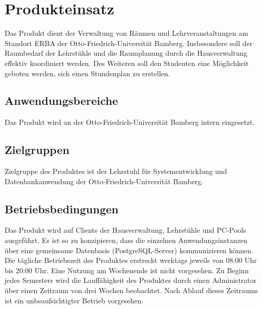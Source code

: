 \section{Produkteinsatz}
\label{sec:Produkteinsatz}
Das Produkt dient der Verwaltung von Räumen und Lehrveranstaltungen am Standort ERBA der Otto-Friedrich-Universität Bamberg. Insbesondere soll der Raumbedarf der Lehrstühle und die Raumplanung durch die Hausverwaltung effektiv koordiniert werden. Des Weiteren soll den Studenten eine Möglichkeit geboten werden, sich einen Stundenplan zu erstellen.

\subsection{Anwendungsbereiche}
Das Produkt wird an der Otto-Friedrich-Universität Bamberg intern eingesetzt.

\subsection{Zielgruppen}
Zielgruppe des Produktes ist der Lehrstuhl für Systementwicklung und Datenbankanwendung der Otto-Friedrich-Universität Bamberg.

\subsection{Betriebsbedingungen}
Das Produkt wird auf Clients der Hausverwaltung, Lehrstühle und PC-Pools ausgeführt. Es ist so zu konzipieren, dass die einzelnen Anwendungsinstanzen über eine gemeinsame Datenbasis (PostgreSQL-Server) kommunizieren können.
Die tägliche Betriebszeit des Produktes erstreckt werktags jeweils von 08:00 Uhr bis 20:00 Uhr. Eine Nutzung am Wochenende ist nicht vorgesehen.
Zu Beginn jedes Semesters wird die Lauffähigkeit des Produktes durch einen Administrator über einen Zeitraum von drei Wochen beobachtet. Nach Ablauf dieses Zeitraums ist ein unbeaufsichtigter Betrieb vorgesehen.